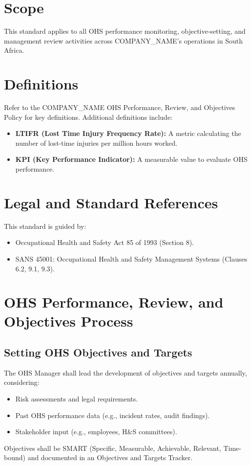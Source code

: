 \documentclass[12pt]{article}
\begin{document}
\section{Scope}
This standard applies to all OHS performance monitoring, objective-setting, and management review activities across {{COMPANY_NAME}}’s operations in South Africa.

\section{Definitions}
Refer to the {{COMPANY_NAME}} OHS Performance, Review, and Objectives Policy for key definitions. Additional definitions include:
\begin{itemize}
    \item \textbf{LTIFR (Lost Time Injury Frequency Rate):} A metric calculating the number of lost-time injuries per million hours worked.
    \item \textbf{KPI (Key Performance Indicator):} A measurable value to evaluate OHS performance.
\end{itemize}

\section{Legal and Standard References}
This standard is guided by:
\begin{itemize}
    \item Occupational Health and Safety Act 85 of 1993 (Section 8).
    \item SANS 45001: Occupational Health and Safety Management Systems (Clauses 6.2, 9.1, 9.3).
\end{itemize}

\section{OHS Performance, Review, and Objectives Process}

\subsection{Setting OHS Objectives and Targets}
The OHS Manager shall lead the development of objectives and targets annually, considering:
\begin{itemize}
    \item Risk assessments and legal requirements.
    \item Past OHS performance data (e.g., incident rates, audit findings).
    \item Stakeholder input (e.g., employees, H&S committees).
\end{itemize}
Objectives shall be SMART (Specific, Measurable, Achievable, Relevant, Time-bound) and documented in an Objectives and Targets Tracker.
\end{document}
